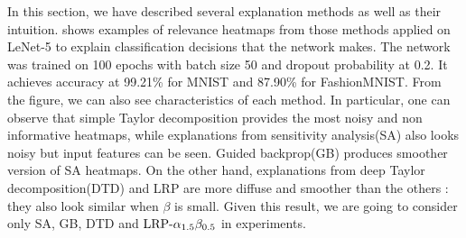 In this section, we have described several explanation methods as well as their intuition.  \addfigure{\ref{fig:lenet_heatmaps}} shows  examples of relevance heatmaps from those methods applied on LeNet-5\cite{LeCunGradientBasedLearningApplied2001} to explain classification decisions that the network makes. The network was trained on 100 epochs with batch size 50 and dropout probability at 0.2. It achieves accuracy at 99.21\% for MNIST and 87.90\% for FashionMNIST. From the figure, we can also see characteristics of each method. In particular, one can observe that simple Taylor decomposition provides the most noisy and non informative heatmaps, while explanations from sensitivity analysis(SA) also looks noisy but input features can be seen. Guided backprop(GB) produces smoother version of SA heatmaps. On the other hand, explanations from deep Taylor decomposition(DTD) and LRP are more diffuse and smoother than the others : they also look similar when $\beta$ is small.  Given this result, we are going to consider only SA, GB, DTD and $\text{LRP-}\alpha_{1.5}\beta_{0.5}$ in experiments.

	